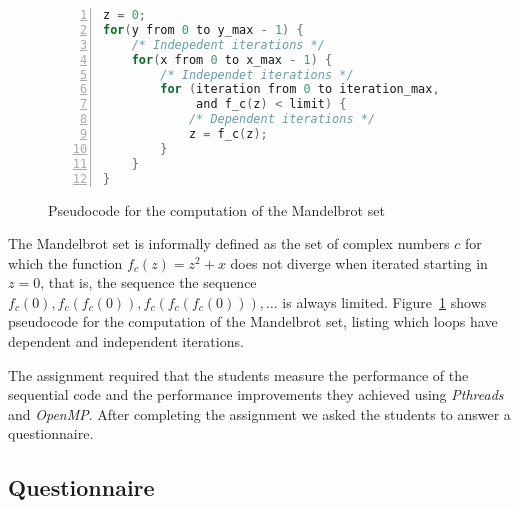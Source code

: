 \begin{figure}[htb]
\begin{minipage}{\linewidth}
\begin{lstlisting}[language=C, basicstyle=\ttfamily\scriptsize, numbers=left,
                   frame=no, showspaces=false, showstringspaces=false,
                   numberstyle=\tiny,
                   xleftmargin=0.5cm,
                   keywords={%
                       DATATYPE, pthread_t, pthread_create,
                       pthread_join, task_function, NULL, int, main,
                       void, printf, return, pthread_mutex_t,
                       pthread_attr_t, pthread_attr_init,
                       MAX_THREADS, SIZE, char, struct, malloc,
                       MIN, pthread_mutex_lock, pthread_mutex_unlock,
                       pthread_exit, from, to, and%
                       },
                   otherkeywords={::, \#pragma, \#include, <<<,>>>, \&, \*, +, -, /, [, ], >, <}
                   ]
z = 0;
for(y from 0 to y_max - 1) {
    /* Indepedent iterations */
    for(x from 0 to x_max - 1) {
        /* Independet iterations */
        for (iteration from 0 to iteration_max,
             and f_c(z) < limit) {
            /* Dependent iterations */
            z = f_c(z);
        }
    }
}
\end{lstlisting}
\end{minipage}
\caption{Pseudocode for the computation of the Mandelbrot set}
\label{lst:mandelbrot-pseudo}
\end{figure}

The Mandelbrot set is informally defined as the set of complex numbers $c$ for
which the function $f_c(z) = z^2 + x$ does not diverge when iterated starting
in $z=0$, that is, the sequence the sequence $f_c(0), f_c(f_c(0)),
f_c(f_c(f_c(0))),\dots$ is always limited. Figure~\ref{lst:mandelbrot-pseudo}
shows pseudocode for the computation of the Mandelbrot set, listing which loops
have dependent and independent iterations.

The assignment required that the students measure the performance of the
sequential code and the performance improvements they achieved using
\textit{Pthreads} and \textit{OpenMP}. After completing the assignment we asked
the students to answer a questionnaire.

\subsection{Questionnaire}

